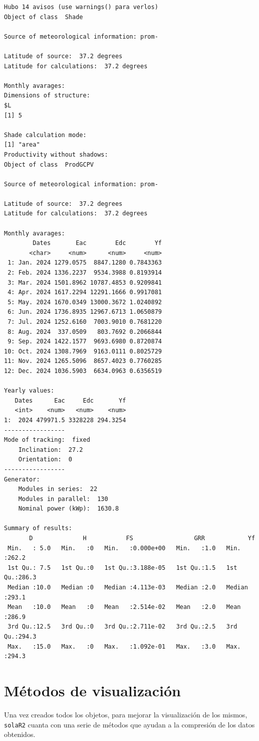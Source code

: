 \begin{verbatim}
Hubo 14 avisos (use warnings() para verlos)
Object of class  Shade 

Source of meteorological information: prom- 

Latitude of source:  37.2 degrees
Latitude for calculations:  37.2 degrees

Monthly avarages:
Dimensions of structure:
$L
[1] 5

Shade calculation mode:
[1] "area"
Productivity without shadows:
Object of class  ProdGCPV 

Source of meteorological information: prom- 

Latitude of source:  37.2 degrees
Latitude for calculations:  37.2 degrees

Monthly avarages:
        Dates       Eac        Edc        Yf
       <char>     <num>      <num>     <num>
 1: Jan. 2024 1279.0575  8847.1280 0.7843363
 2: Feb. 2024 1336.2237  9534.3988 0.8193914
 3: Mar. 2024 1501.8962 10787.4853 0.9209841
 4: Apr. 2024 1617.2294 12291.1666 0.9917081
 5: May. 2024 1670.0349 13000.3672 1.0240892
 6: Jun. 2024 1736.8935 12967.6713 1.0650879
 7: Jul. 2024 1252.6160  7003.9010 0.7681220
 8: Aug. 2024  337.0509   803.7692 0.2066844
 9: Sep. 2024 1422.1577  9693.6980 0.8720874
10: Oct. 2024 1308.7969  9163.0111 0.8025729
11: Nov. 2024 1265.5096  8657.4023 0.7760285
12: Dec. 2024 1036.5903  6634.0963 0.6356519

Yearly values:
   Dates      Eac     Edc       Yf
   <int>    <num>   <num>    <num>
1:  2024 479971.5 3328228 294.3254
-----------------
Mode of tracking:  fixed 
    Inclination:  27.2 
    Orientation:  0 
-----------------
Generator:
    Modules in series:  22 
    Modules in parallel:  130 
    Nominal power (kWp):  1630.8 

Summary of results:
       D              H           FS                 GRR            Yf       
 Min.   : 5.0   Min.   :0   Min.   :0.000e+00   Min.   :1.0   Min.   :262.2  
 1st Qu.: 7.5   1st Qu.:0   1st Qu.:3.188e-05   1st Qu.:1.5   1st Qu.:286.3  
 Median :10.0   Median :0   Median :4.113e-03   Median :2.0   Median :293.1  
 Mean   :10.0   Mean   :0   Mean   :2.514e-02   Mean   :2.0   Mean   :286.9  
 3rd Qu.:12.5   3rd Qu.:0   3rd Qu.:2.711e-02   3rd Qu.:2.5   3rd Qu.:294.3  
 Max.   :15.0   Max.   :0   Max.   :1.092e-01   Max.   :3.0   Max.   :294.3
\end{verbatim}

\section{Métodos de visualización}
\label{sec:org479176c}
\label{sec:metodos-visualizacion}
Una vez creados todos los objetos, para mejorar la visualización de los mismos, \texttt{solaR2} cuanta con una serie de métodos que ayudan a la compresión de los datos obtenidos.

